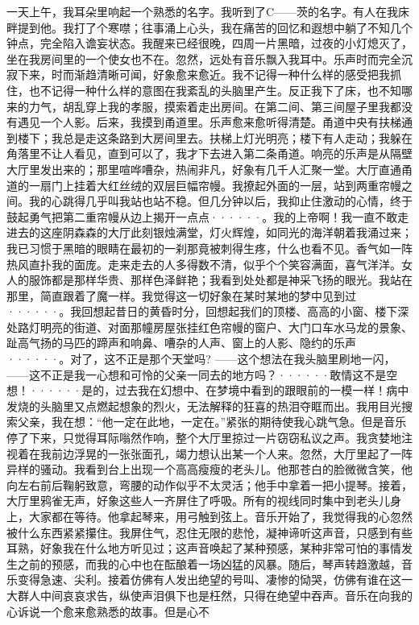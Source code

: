 \documentclass[12pt, UTF8]{ctexbook}
\begin{document}
\par 一天上午，我耳朵里响起一个熟悉的名字。我听到了C——茨的名字。有人在我床畔提到他。我打了个寒噤；往事涌上心头，我在痛苦的回忆和遐想中躺了不知几个钟点，完全陷入谵妄状态。我醒来已经很晚，四周一片黑暗，过夜的小灯熄灭了，坐在我房间里的一个使女也不在。忽然，远处有音乐飘入我耳中。乐声时而完全沉寂下来，时而渐趋清晰可闻，好象愈来愈近。我不记得一种什么样的感受把我抓住，也不记得一种什么样的意图在我紊乱的头脑里产生。反正我下了床，也不知哪来的力气，胡乱穿上我的孝服，摸索着走出房间。在第二间、第三间屋子里我都没有遇见一个人影。后来，我摸到甬道里。乐声愈来愈听得清楚。甬道中央有扶梯通到楼下；我总是走这条路到大房间里去。扶梯上灯光明亮；楼下有人走动；我躲在角落里不让人看见，直到可以了，我才下去进入第二条甬道。响亮的乐声是从隔壁大厅里发出来的；那里喧哗嘈杂，热闹非凡，好象有几千人汇聚一堂。大厅直通甬道的一扇门上挂着大红丝绒的双层巨幅帘幔。我撩起外面的一层，站到两重帘幔之间。我的心跳得几乎叫我站也站不稳。但几分钟以后，我抑止住激动的心情，终于鼓起勇气把第二重帘幔从边上揭开一点点······。我的上帝啊！我一直不敢走进去的这座阴森森的大厅此刻银烛满堂，灯火辉煌，如同光的海洋朝着我涌过来；我已习惯于黑暗的眼睛在最初的一刹那竟被刺得生疼，什么也看不见。香气如一阵热风直扑我的面庞。走来走去的人多得数不清，似乎个个笑容满面，喜气洋洋。女人的服饰都是那样华贵、那样色泽鲜艳；我看到处处都是神采飞扬的眼光。我站在那里，简直跟着了魔一样。我觉得这一切好象在某时某地的梦中见到过······。我回想起昔日的黄昏时分，回想起我们的顶楼、高高的小窗、楼下深处路灯明亮的街道、对面那幢房屋张挂红色帘幔的窗户、大门口车水马龙的景象、趾高气扬的马匹的蹄声和响鼻、嘈杂的人声、窗上的人影、隐约的乐声······。对了，这不正是那个天堂吗? ——这个想法在我头脑里刷地一闪，——这不正是我一心想和可怜的父亲一同去的地方吗？······敢情这不是空想！······是的，过去我在幻想中、在梦境中看到的跟眼前的一模一样！病中发烧的头脑里又点燃起想象的烈火，无法解释的狂喜的热泪夺眶而出。我用目光搜索父亲，我在想：“他一定在此地，一定在。”紧张的期待使我心跳气急。但是音乐停了下来，只觉得耳际嗡然作响，整个大厅里掠过一片窃窃私议之声。我贪婪地注视着在我前边浮晃的一张张面孔，竭力想认出某一个人来。忽然，大厅里起了一阵异样的骚动。我看到台上出现一个高高瘦瘦的老头儿。他那苍白的脸微微含笑，他向左右前后鞠躬致意，弯腰的动作似乎不太灵活；他手中拿着一把小提琴。接着，大厅里鸦雀无声，好象这些人一齐屏住了呼吸。所有的视线同时集中到老头儿身上，大家都在等待。他拿起琴来，用弓触到弦上。音乐开始了，我觉得我的心忽然被什么东西紧紧攥住。我屏住气，忍住无限的悲怆，凝神谛听这声音，只感到有些耳熟，好象我在什么地方听见过；这声音唤起了某种预感，某种非常可怕的事情发生之前的预感，而我的心中也在酝酿着一场凶猛的风暴。随后，琴声转趋激越，音乐变得急速、尖利。接着仿佛有人发出绝望的号叫、凄惨的恸哭，仿佛有谁在这一大群人中间哀哀求告，纵使声泪俱下也是枉然，只得在绝望中吞声。音乐在向我的心诉说一个愈来愈熟悉的故事。但是心不
\end{document}
